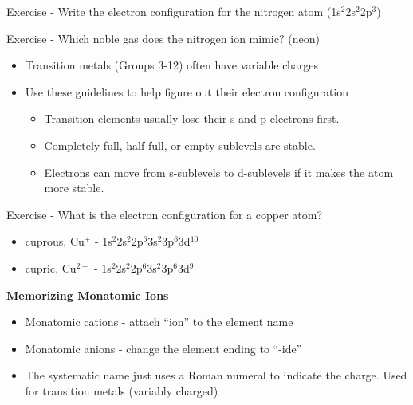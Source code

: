 \documentclass[../hchem.tex]{subfiles}
\begin{document}
Exercise - Write the electron configuration for the nitrogen atom (1s$^2$2s$^2$2p$^3$)

Exercise - Which noble gas does the nitrogen ion mimic? (neon)

\begin{itemize}
    \item Transition metals (Groups 3-12) often have variable charges 
    \item Use these guidelines to help figure out their electron configuration
    \begin{itemize}
        \item Transition elements usually lose their s and p electrons first. 
        \item Completely full, half-full, or empty sublevels are stable.
        \item Electrons can move from s-sublevels to d-sublevels if it makes the atom more stable.
    \end{itemize}
\end{itemize}

Exercise - What is the electron configuration for a copper atom? 
\begin{itemize}
    \item cuprous, Cu$^+$ - 1s$^2$2s$^2$2p$^6$3s$^2$3p$^6$3d$^{10}$
    \item cupric, Cu$^{2+}$ - 1s$^2$2s$^2$2p$^6$3s$^2$3p$^6$3d$^9$
\end{itemize}

\textbf{Memorizing Monatomic Ions}
\begin{itemize}
    \item Monatomic cations - attach ``ion'' to the element name 
    \item Monatomic anions - change the element ending to ``-ide''
    \item The systematic name just uses a Roman numeral to indicate the charge. Used for transition metals (variably charged)
\end{itemize}
\end{document}
